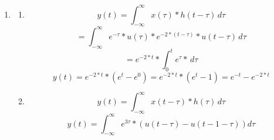 \documentclass[10pt,a4paper, margin=1in]{article}
\begin{document}
\begin{enumerate}
\item %
    \begin{enumerate}
    \item %
    \begin{equation*}
        y(t) = \int_{-\infty}^{\infty} x(\tau)*h(t-\tau) \,d\tau 
    \end{equation*}
    \begin{equation*}
        = \int_{-\infty}^{\infty} e^{-\tau}*u(\tau)*e^{-2*(t-\tau)}*u(t-\tau) \,d\tau 
    \end{equation*}
    \begin{equation*}
        = e^{-2*t}*\int_{0}^{t} e^{\tau}* \,d\tau 
    \end{equation*}
    \begin{equation}
        y(t) = e^{-2*t}* (e^t - e^0) = e^{-2*t}* (e^t - 1) =e^{-t} - e^{-2*t}
    \end{equation}
    \item %
    \begin{equation*}
        y(t) = \int_{-\infty}^{\infty} x(t-\tau)*h(\tau) \,d\tau 
    \end{equation*}
    \begin{equation*}
        y(t) = \int_{-\infty}^{\infty} e^{3\tau}*(u(t-\tau) - u(t-1-\tau))d\tau

\end{equation*}
\end{enumerate}
\end{enumerate}
\end{document}
